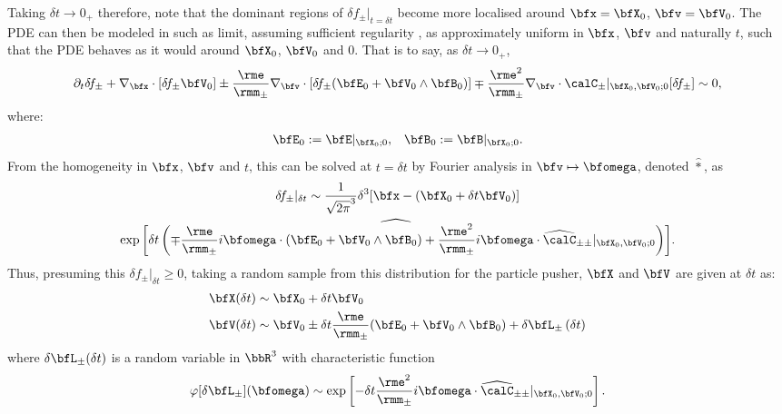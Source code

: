     Taking $\delta t  \rightarrow  0_{+}$ therefore, note that the dominant regions of $\delta\!f_{\pm}|_{t = \delta t}$ become more localised around $\bfx  =  \bfX_{0}$, $\bfv  =  \bfV_{0}$. The PDE can then be modeled in such as limit, assuming sufficient regularity , as approximately uniform in $\bfx$, $\bfv$ and naturally $t$, such that the PDE behaves as it would around $\bfX_{0}$, $\bfV_{0}$ and $0$. That is to say, as $\delta t  \rightarrow  0_{+}$,
    \begin{equation}
        \partial_{t}\delta\!f_{\pm} + \nabla_{\bfx}\cdot[\delta\!f_{\pm}\bfV_{0}] \pm \frac{\rme}{\rmm_{\pm}}\nabla_{\bfv}\cdot[\delta\!f_{\pm}(\bfE_{0} + \bfV_{0}\wedge\bfB_{0})] \mp \frac{\rme^{2}}{\rmm_{\pm}}\nabla_{\bfv}\cdot\calC_{\pm}|_{\bfX_{0}, \bfV_{0}; 0}[\delta\!f_{\pm}]  \sim  0,
    \end{equation}
    where:
    \begin{align}
        \bfE_{0}  :=  \bfE|_{\bfX_{0}; 0},  &&
        \bfB_{0}  :=  \bfB|_{\bfX_{0}; 0}.
    \end{align}
    From the homogeneity in $\bfx$, $\bfv$ and $t$, this can be solved at $t  =  \delta t$ by Fourier analysis in $\bfv  \mapsto  \bfomega$, denoted $\widehat{*}$, as
    \begin{multline}
        \delta\!f_{\pm}|_{\delta t}  \sim  \frac{1}{\sqrt{2\pi}^{3}}\delta^{3}[\bfx - (\bfX_{0} + \delta t\bfV_{0})]  \\
        \widehat{\exp\left[\delta t\left(\mp\frac{\rme}{\rmm_{\pm}}i\bfomega\cdot(\bfE_{0} + \bfV_{0}\wedge\bfB_{0}) + \frac{\rme^{2}}{\rmm_{\pm}}i\bfomega\cdot\widehat{\calC}_{\pm\pm}|_{\bfX_{0}, \bfV_{0}; 0}\right)\right]}.
    \end{multline}
    Thus, presuming this $\delta\!f_{\pm}|_{\delta t}  \geq  0$, taking a random sample from this distribution for the particle pusher, $\bfX$ and $\bfV$ are given at $\delta t$ as:
    \begin{align}
        \bfX(\delta t)  &\sim  \bfX_{0} + \delta t\bfV_{0}  \\
        \bfV(\delta t)  &\sim  \bfV_{0} \pm \delta t\frac{\rme}{\rmm_{\pm}}(\bfE_{0} + \bfV_{0}\wedge\bfB_{0}) + \delta\bfL_{\pm}\left(\delta t\right)
    \end{align}
    where $\delta\bfL_{\pm}(\delta t)$ is a random variable in $\bbR^{3}$ with characteristic function
    \begin{equation}
        \varphi[\delta\bfL_{\pm}](\bfomega)  \sim  \exp\left[- \delta t\frac{\rme^{2}}{\rmm_{\pm}}i\bfomega\cdot\widehat{\calC}_{\pm\pm}|_{\bfX_{0}, \bfV_{0}; 0}\right].
    \end{equation}

